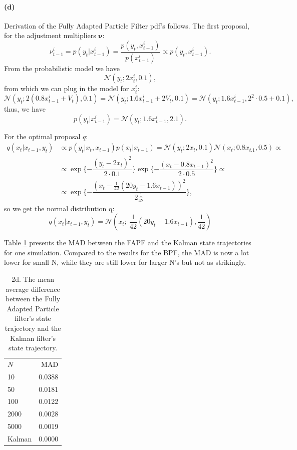 \documentclass{article}
\begin{document}
\paragraph{(d)} Derivation of the Fully Adapted Particle Filter pdf's follows.
The first proposal, for the adjustment multipliers $\bm{\nu}$:
	\begin{equation}
		\nu_{t-1}^i = p(y_t|x_{t-1}^i) = \dfrac{p(y_t,x_{t-1}^i)}{p(x_{t-1}^i)} \propto p(y_t,x_{t-1}^i).
	\end{equation}
	From the probabilistic model we have 
	\begin{equation}
		\mathcal{N}(y_t; 2x_t^i,0.1),
	\end{equation}
	from which we can plug in the model for $x_t^i$:
	\begin{equation}
		\mathcal{N}(y_t; 2(0.8x_{t-1}^i+V_t),0.1) = \mathcal{N}(y_t; 1.6x_{t-1}^i + 2V_t,0.1) = \mathcal{N}(y_t; 1.6x_{t-1}^i,2^2\cdot 0.5 + 0.1),
	\end{equation}
	thus, we have 
	\begin{equation}
		p(y_t|x_{t-1}^i) = \mathcal{N}(y_t; 1.6x_{t-1}^i, 2.1).
	\end{equation}
	
For the optimal proposal $q$:
	\begin{align}
		q(x_t|x_{t-1}, y_t) &\propto p(y_t|x_t,x_{t-1})p(x_t|x_{t-1}) = \mathcal{N}(y_t;2x_t,0.1)\mathcal{N}(x_t; 0.8x_{t.1},0.5) \propto\\
		&\propto \exp\{-\dfrac{(y_t-2x_t)^2}{2\cdot 0.1}\}\exp\{-\dfrac{(x_t-0.8x_{t-1})^2}{2\cdot 0.5}\}\propto\\
		&\propto\exp\{-\dfrac{(x_t-\frac{1}{42}(20y_t-1.6x_{t-1}))^2}{2\frac{1}{42}}\},
	\end{align}
so we get the normal distribution q:
	\begin{equation}
		q(x_t|x_{t-1}, y_t) = \mathcal{N}(x_t;~\frac{1}{42}(20y_t-1.6x_{t-1}), \frac{1}{42})
	\end{equation}


Table \ref{tab:2d} presents the MAD between the FAPF and the Kalman state trajectories for one simulation. Compared to the results for the BPF, the MAD is now a lot lower for small N, while they are still lower for larger N's but not as strikingly. 
	\begin{table}
		\centering
		\begin{tabular}{lr}\hline
			$N$ & MAD 		\\
			10 	& 0.0388	\\
			50	& 0.0181	\\
			100	& 0.0122	\\
			2000& 0.0028	\\
			5000& 0.0019 	\\
			Kalman & 0.0000	\\\hline
		\end{tabular}
		\caption{2d. The mean average difference between the Fully Adapted Particle filter's state trajectory and the Kalman filter's state trajectory.}
		\label{tab:2d}
	\end{table}
\end{document}
